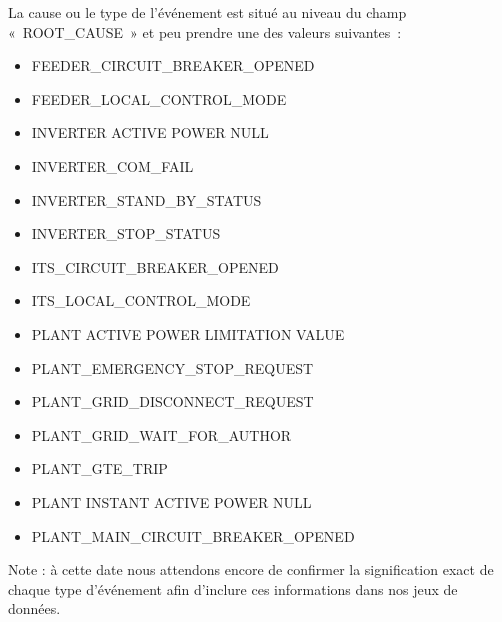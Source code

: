 La cause ou le type de l'événement est situé au niveau du champ « ROOT\_CAUSE » et peu prendre une des valeurs suivantes :

\begin{itemize}
\item FEEDER\_CIRCUIT\_BREAKER\_OPENED
\item FEEDER\_LOCAL\_CONTROL\_MODE
\item INVERTER ACTIVE POWER NULL
\item INVERTER\_COM\_FAIL
\item INVERTER\_STAND\_BY\_STATUS
\item INVERTER\_STOP\_STATUS
\item ITS\_CIRCUIT\_BREAKER\_OPENED
\item ITS\_LOCAL\_CONTROL\_MODE
\item PLANT ACTIVE POWER LIMITATION VALUE
\item PLANT\_EMERGENCY\_STOP\_REQUEST
\item PLANT\_GRID\_DISCONNECT\_REQUEST
\item PLANT\_GRID\_WAIT\_FOR\_AUTHOR
\item PLANT\_GTE\_TRIP
\item PLANT INSTANT ACTIVE POWER NULL
\item PLANT\_MAIN\_CIRCUIT\_BREAKER\_OPENED
\end{itemize}

Note : à cette date nous attendons encore de confirmer la signification exact de chaque type d'événement afin d'inclure ces informations dans nos jeux de données.